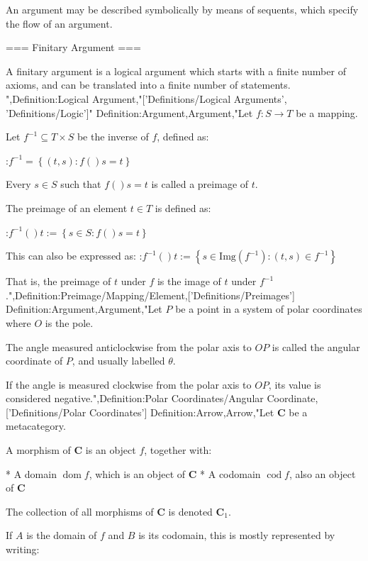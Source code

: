 An argument may be described symbolically by means of sequents, which specify the flow of an argument.


=== Finitary Argument ===

A finitary argument is a logical argument which starts with a finite number of axioms, and can be translated into a finite number of statements.
",Definition:Logical Argument,"['Definitions/Logical Arguments', 'Definitions/Logic']"
Definition:Argument,Argument,"Let $f: S \to T$ be a mapping.

Let $f^{-1} \subseteq T \times S$ be the inverse of $f$, defined as:

:$f^{-1} = \left\lbrace \left( t, s \right): f \left(   \right)s = t \right\rbrace$


Every $s \in S$ such that $f \left(   \right)s = t$ is called a preimage of $t$.


The preimage of an element $t \in T$ is defined as:

:$f^{-1}  \left(   \right)t := \left\lbrace s \in S: f \left(   \right)s = t \right\rbrace$


This can also be expressed as:
:$f^{-1}  \left(   \right)t := \left\lbrace s \in \mathrm {Img} \left( f^{-1}  \right): \left( t, s \right) \in f^{-1}  \right\rbrace$


That is, the preimage of $t$ under $f$ is the image of $t$ under $f^{-1}$.",Definition:Preimage/Mapping/Element,['Definitions/Preimages']
Definition:Argument,Argument,"Let $P$ be a point in a system of polar coordinates where $O$ is the pole.


The angle measured anticlockwise from the polar axis to $OP$ is called the angular coordinate of $P$, and usually labelled $\theta$.

If the angle is measured clockwise from the polar axis to $OP$, its value is considered negative.",Definition:Polar Coordinates/Angular Coordinate,['Definitions/Polar Coordinates']
Definition:Arrow,Arrow,"Let $\mathbf C$ be a metacategory.


A morphism of $\mathbf C$ is an object $f$, together with:

* A domain $\operatorname {dom} f$, which is an object of $\mathbf C$
* A codomain $\operatorname {cod} f$, also an object of $\mathbf C$


The collection of all morphisms of $\mathbf C$ is denoted $\mathbf C_1$.


If $A$ is the domain of $f$ and $B$ is its codomain, this is mostly represented by writing:


